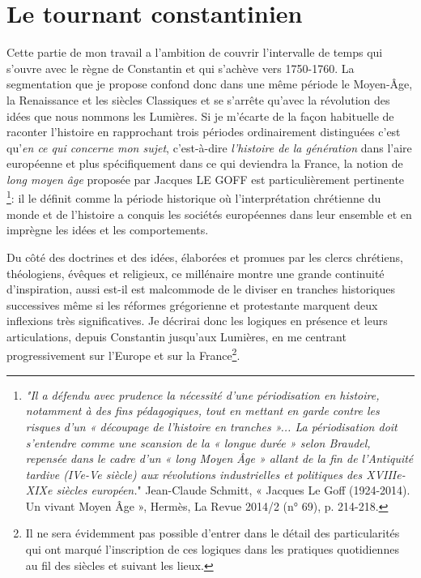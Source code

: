 

\chapter{Le tournant constantinien}
 Cette partie de mon travail a l'ambition de couvrir l'intervalle de temps qui s'ouvre avec le règne de Constantin et qui s'achève vers 1750-1760. La segmentation que je propose confond donc dans une même période le Moyen-Âge, la Renaissance et les siècles Classiques et se s'arrête qu'avec la révolution des idées que nous nommons les Lumières. Si je m'écarte de la façon habituelle de raconter l'histoire en rapprochant trois périodes ordinairement distinguées c'est qu'\emph{en ce qui concerne mon sujet}, c'est-à-dire \emph{l'histoire de la génération} dans l'aire européenne et plus spécifiquement dans ce qui deviendra la France, la notion de \emph{long moyen âge} proposée par Jacques LE GOFF est particulièrement pertinente \footnote{\emph{"Il a défendu avec prudence la nécessité d’une périodisation en histoire, notamment à des fins pédagogiques, tout en mettant en garde contre les risques d’un « découpage de l’histoire en tranches »... La périodisation doit s’entendre comme une scansion de la « longue durée » selon Braudel, repensée dans le cadre d’un « long Moyen Âge » allant de la fin de l’Antiquité tardive (IVe-Ve siècle) aux révolutions industrielles et politiques des XVIIIe-XIXe siècles européen.}" Jean-Claude Schmitt, « Jacques Le Goff (1924-2014). Un vivant Moyen Âge », Hermès, La Revue 2014/2 (n° 69), p. 214-218.}: il le définit comme la période historique où l'interprétation chrétienne du monde et de l'histoire a conquis les sociétés européennes dans leur ensemble et en imprègne les idées et les comportements. 
 
 

Du côté des doctrines et des idées, élaborées et promues par les clercs chrétiens, théologiens, évêques et religieux, ce millénaire montre une grande continuité d'inspiration, aussi est-il est malcommode de le diviser en tranches historiques successives même si les réformes grégorienne et protestante marquent deux inflexions très significatives. Je décrirai donc les logiques en présence et leurs articulations, depuis Constantin jusqu'aux Lumières, en me centrant progressivement sur l'Europe et sur la France\footnote{Il ne sera évidemment pas possible d'entrer dans le détail des particularités qui ont marqué l'inscription de ces logiques dans les pratiques quotidiennes au fil des siècles et suivant les lieux.}.

